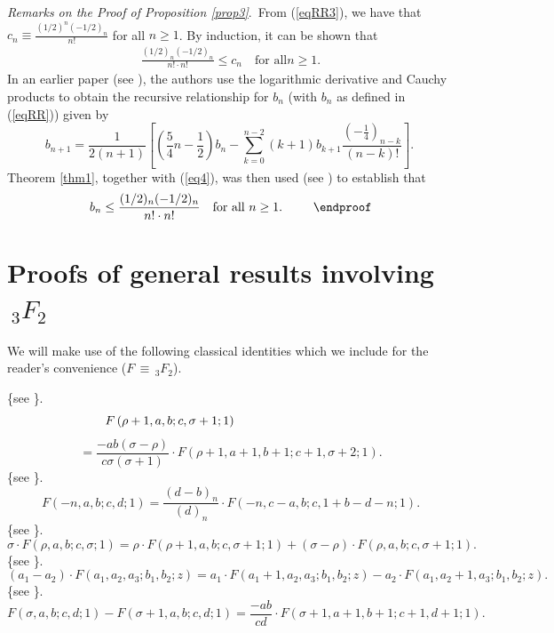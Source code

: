 \documentclass[final,oneeqnum]{siamltex}
\begin{document}
{\it Remarks on the Proof of Proposition {\rm\ref{prop3}}}.\ From  
(\ref{eqRR3}),
we have that
$\displaystyle c_{n} \equiv \frac{(1/2)^{n}(-1/2)_{n}}{n!}$ for all
$n\geq 1$.
By induction, it can be shown that
\begin{eqnarray}
 \frac{(1/2)_{n}(-1/2)_{n}}{n!\cdot n!} \leq c_{n} \quad \mbox{for all
$n\geq 1$.}  \nonumber
\end{eqnarray} 
In an earlier  paper (see \cite{BPR}), the authors use
 the logarithmic derivative  and  Cauchy products to obtain
 the recursive relationship for $b_{n}$
 (with $b_n$ as defined in (\ref{eqRR})) given by
\begin{equation}
b_{n+1}=\frac{1}{2(n+1)}\left[ \left( \frac{5}{4}n-\frac{1}{2}\right)
b_{n}-\sum\limits_{k=0}^{n-2}(k+1)b_{k+1}\frac{\left( -\frac{1}{4}\right)
_{n-k}}{(n-k)!}\right].\ \label{eq4}
\end{equation}  
Theorem \ref{thm1}, together with (\ref{eq4}), was then used
 (see \cite{BPR}) to
 establish that
\begin{eqnarray}
 b_{n} \leq \frac{(1/2)_{n}(-1/2)_{n}}{n!\cdot n!} \quad
\mbox{for all }  n\geq 1.\  \nonumber \, \qquad\endproof%
\end{eqnarray}

\section{Proofs of general results involving \protect\boldmath$\,_{3}F_{2}$}

\noindent We will make use of the following classical
 identities which we include for the reader's convenience
($F\,\equiv{\,}_{3}F_{2}$).

 \{see \cite[p. 440, eq. (33)]{Pr}\}.
\[ 
\hspace{-15pc} F\left(\rho,a,b;c,\sigma;1\right)-F\left(\rho+1,a,b;c,\sigma+1;1\right) 
\]
\vspace{-2pc}
\[
= \frac{-ab(\sigma-\rho)}{c\sigma(\sigma+1)}
\cdot F\left(\rho+1,a+1,b+1;c+1,\sigma+2;1\right).
\]
 \{see \cite[p. 59, eq. (3.1.1)]{GR}\}.
\[ 
F(-n,a,b;c,d;1)=\frac{(d-b)_{n}}{(d)_{n}}\cdot F(-n,c-a,b;c,1+b-d-n;1).
\]
 \{see \cite[p. 440, eq. (26)]{Pr}\}.
\[
\sigma\cdot F\left(\rho,a,b;c,\sigma;1\right) =
\rho\cdot F\left(\rho+1,a,b;c,\sigma+1;1\right) + (\sigma -\rho)\cdot
F\left(\rho,a,b;c,\sigma+1;1\right).
\]
 \{see \cite[p. 82, eq.\ (14)]{R}\}.
\[ 
(a_{1}-a_{2})\cdot F(a_{1},a_{2},a_{3};b_{1},b_{2};z)=
a_{1}\cdot F(a_{1}+1,a_{2},a_{3};b_{1},b_{2};z)-a_{2}\cdot
F(a_{1},a_{2}+1,a_{3};b_{1},b_{2};z).
\]
 \{see \cite[p. 440, eq. (30)]{Pr}\}.
\[ 
F\left(\sigma,a,b;c,d;1\right)-F\left(\sigma+1,a,b;c,d;1\right)  =
\frac{-ab}{cd}\cdot
F\left(\sigma+1,a+1,b+1;c+1,d+1;1\right).
\]
\end{document}
